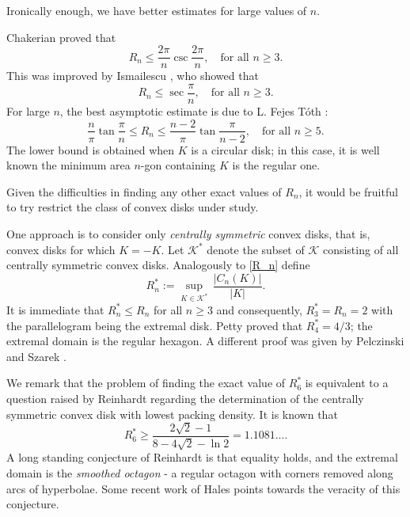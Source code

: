 \documentclass [10pt,oneside]{amsart}
\theoremstyle{definition}
\theoremstyle{plain}
\begin{document}
Ironically enough, we have better estimates for large values of $n$.

Chakerian \cite{Cha73} proved that
\begin{equation}\label{chak73}
R_n\le \frac{2\pi}{n}\csc\frac{2\pi}{n},\quad {\text {for all}}\,\, n\ge 3.
\end{equation}
This was improved by Ismailescu \cite{Ism09}, who showed that
\begin{equation}\label{isma}
R_n\le \sec\frac{\pi}{n},\quad {\text {for all}}\,\, n\ge 3.
\end{equation}
For large $n$, the best asymptotic estimate is due to L. Fejes T\'{o}th \cite{FT40}:
\begin{equation}\label{lft}
\frac{n}{\pi}\tan\frac{\pi}{n}\le R_n\le \frac{n-2}{\pi}\tan\frac{\pi}{n-2},\quad {\text {for all}}\,\, n\ge 5.
\end{equation}
The lower bound is obtained when $K$ is a circular disk; in this case, it is well known the minimum area $n$-gon containing $K$ is the regular one.

Given the difficulties in finding any other exact values of $R_n$, it would be fruitful to try restrict the class of convex disks under study.

One approach is to consider only \emph{centrally symmetric} convex disks, that is, convex disks for which $K=-K$. Let $\mathcal{K}^{*}$ denote the subset of $\mathcal{K}$ consisting of all centrally symmetric convex disks.
Analogously to \eqref{R_n} define
\begin{equation}\label{Rnsym}
R^{*}_n:=\sup_{K\in \mathcal{K}^*}\, \frac{|C_n(K)|}{|K|}.
\end{equation}
It is immediate that $R^*_n\le R_n$ for all $n\ge 3$ and consequently, $R^*_3=R_n=2$ with the parallelogram being the extremal disk.
Petty \cite{Pet55} proved that $R^*_4=4/3$; the extremal domain is the regular hexagon. A different proof was given by Pelczinski and Szarek \cite{PS91}.

We remark that the problem of finding the exact value of $R^*_6$ is equivalent to a question raised by Reinhardt \cite{reinhardt} regarding the determination of the centrally symmetric convex disk with lowest packing density. It is known that
\begin{equation*}
R^*_6\ge \frac{2\sqrt{2}-1}{8-4\sqrt{2}-\ln{2}}=1.1081\dots.
\end{equation*}
A long standing conjecture of Reinhardt is that equality holds, and the extremal domain is the \emph{smoothed octagon} - a regular octagon with corners removed along arcs of hyperbolae.
Some recent work of Hales \cite{hales} points towards the veracity of this conjecture.
\end{document}
